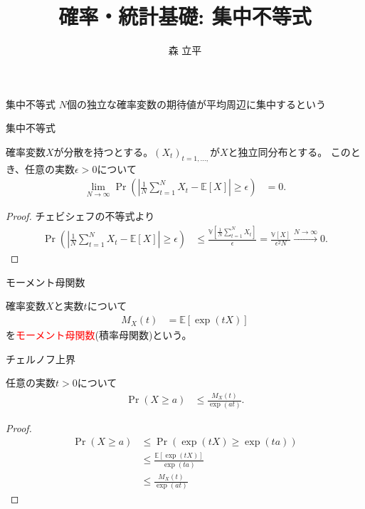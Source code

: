 \documentclass[lualatex,handout]{beamer}
\title{確率・統計基礎: 集中不等式}
\author{森 立平}
\date{}
\newcommand{\emm}[1]{\textcolor{red}{#1}}
\newcommand{\expt}[1]{\mathbb{E}\left[#1\right]}
\newcommand{\var}[1]{\mathbb{V}\left[#1\right]}
\theoremstyle{definition}
\begin{document}
\begin{frame}[plain]
\maketitle
\end{frame}

\begin{frame}{集中不等式}
$N$個の独立な確率変数の期待値が平均周辺に集中するという
\end{frame}


\begin{frame}{集中不等式}
\begin{theorem}[大数の弱法則]
確率変数$X$が分散を持つとする。$(X_t)_{t=1,\dotsc,}$が$X$と独立同分布とする。
このとき、任意の実数$\epsilon>0$について
\begin{align*}
\lim_{N\to\infty}\Pr\left(\left|\frac1N\sum_{t=1}^N X_t-\expt{X}\right|\ge \epsilon\right) &=0.
\end{align*}
\end{theorem}
\begin{proof}
チェビシェフの不等式より
\begin{align*}
\Pr\left(\left|\frac1N\sum_{t=1}^N X_t-\expt{X}\right|\ge \epsilon\right) &\le
\frac{\var{\frac1N\sum_{t=1}^NX_t}}{\epsilon} = \frac{\var{X}}{\epsilon^2N}\stackrel{N\to\infty}{\longrightarrow} 0.
\end{align*}
\end{proof}
\end{frame}

\begin{frame}{モーメント母関数}
\begin{definition}
確率変数$X$と実数$t$について
\begin{align*}
M_X(t) &= \expt{\exp(tX)}
\end{align*}
を\emm{モーメント母関数}(積率母関数)という。
\end{definition}
\begin{example}
\end{example}
\end{frame}

\begin{frame}{チェルノフ上界}
\begin{theorem}
任意の実数$t>0$について
\begin{align*}
\Pr(X\ge a)&\le\frac{M_X(t)}{\exp(at)}.
\end{align*}
\end{theorem}
\begin{proof}
\begin{align*}
\Pr(X\ge a)&\le\Pr(\exp(tX)\ge\exp(ta))\\
&\le\frac{\expt{\exp(tX)}}{\exp(ta)}\\
&\le\frac{M_X(t)}{\exp(at)}
\end{align*}
\end{proof}
\end{frame}
\end{document}
